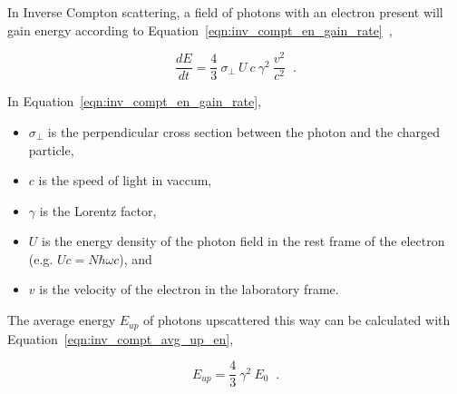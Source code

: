   In Inverse Compton scattering, a field of photons with an electron present will gain energy according to Equation~\ref{eqn:inv_compt_en_gain_rate}~\cite{inv_compt1,inv_compt2},
  
  \begin{equation}\label{eqn:inv_compt_en_gain_rate}
    \frac{dE}{dt} = \frac{4}{3} \: \sigma_{\perp} \: U \: c \: \gamma^2 \: \frac{ v^2 }{ c^2 } \;\; .
  \end{equation}

  In Equation~\ref{eqn:inv_compt_en_gain_rate}, 
  \begin{itemize}
    \item $\sigma_{\perp}$ is the perpendicular cross section between the photon and the charged particle, 
    \item $c$ is the speed of light in vaccum,
    \item $\gamma$ is the Lorentz factor,
    \item $U$ is the energy density of the photon field in the rest frame of the electron (e.g. $Uc=N\hbar \omega c$), and 
    \item $v$ is the velocity of the electron in the laboratory frame.
  \end{itemize}

  The average energy $E_{up}$ of photons upscattered this way can be calculated with Equation~\ref{eqn:inv_compt_avg_up_en},
  
  \begin{equation}\label{eqn:inv_compt_avg_up_en}
    E_{up} = \frac{4}{3} \: \gamma^2 \: E_{0} \;\;.
  \end{equation}
  
  
  
  
  
